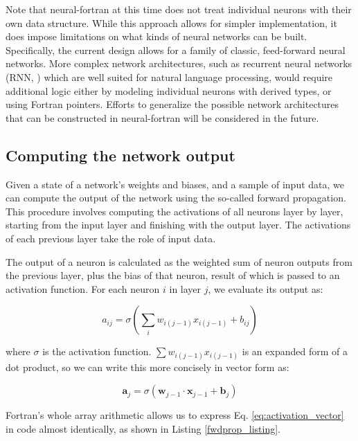 \documentclass[sigplan, review=false, screen=true, balance=true]{acmart}
\begin{document}
Note that neural-fortran at this time does not treat individual neurons
with their own data structure. While this approach allows for simpler
implementation, it does impose limitations on what kinds of neural networks
can be built. Specifically, the current design allows for a family of classic,
feed-forward neural networks. More complex network architectures, such
as recurrent neural networks (RNN, \cite{hochreiter97}) which are well suited
for natural language processing, would require additional logic either by
modeling individual neurons with derived types, or using Fortran pointers.
Efforts to generalize the possible network architectures that can be constructed
in neural-fortran will be considered in the future.

\subsection{Computing the network output}

Given a state of a network's weights and biases, and a sample of input data,
we can compute the output of the network using the so-called forward propagation.
This procedure involves computing the activations of all neurons layer by layer,
starting from the input layer and finishing with the output layer. The
activations of each previous layer take the role of input data.

The output of a neuron is calculated as the weighted sum of neuron outputs
from the previous layer, plus the bias of that neuron, result of which is passed
to an activation function. For each neuron $i$ in layer $j$, we evaluate its
output as:

\begin{equation}
  \label{eq:activation}
  a_{ij} = \sigma \left( \sum_i w_{i(j-1)} x_{i(j-1)} + b_{ij} \right)
\end{equation}

where $\sigma$ is the activation function.
$\sum w_{i(j-1)} x_{i(j-1)}$ is an expanded form of a dot product,
so we can write this more concisely in vector form as:

\begin{equation}
  \label{eq:activation_vector}
  \mathbf{a}_j = \sigma \left( \mathbf{w}_{j-1} \cdot \mathbf{x}_{j-1} + \mathbf{b}_j \right)
\end{equation}

Fortran's whole array arithmetic allows us to express Eq. \ref{eq:activation_vector}
in code almost identically, as shown in Listing \ref{fwdprop_listing}.
\end{document}
